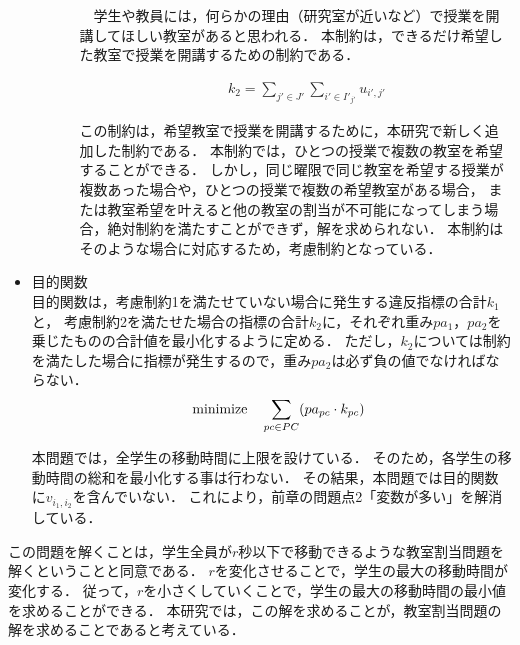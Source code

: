 \documentclass[12pt, a4paper, fleqn]{jreport}
\begin{document}
\begin{itemize}
\begin{itemize}
\begin{itemize}
\vspace{-5.0mm}
　学生や教員には，何らかの理由（研究室が近いなど）で授業を開講してほしい教室があると思われる．
本制約は，できるだけ希望した教室で授業を開講するための制約である．

\vspace{-3.0mm}
\begin{eqnarray}
\label{hkouryo2} 
&&k_2= \sum_{j' \in J'}  \sum_{i' \in I'_{j'}}u_{i', j'}
\end{eqnarray}

\vspace{5.0mm}
この制約は，希望教室で授業を開講するために，本研究で新しく追加した制約である．
本制約では，ひとつの授業で複数の教室を希望することができる．
しかし，同じ曜限で同じ教室を希望する授業が複数あった場合や，ひとつの授業で複数の希望教室がある場合，
または教室希望を叶えると他の教室の割当が不可能になってしまう場合，絶対制約を満たすことができず，解を求められない．
本制約はそのような場合に対応するため，考慮制約となっている．

\vspace{5.0mm}
\end{itemize}
\end{itemize}
\item 目的関数\\
目的関数は，考慮制約1を満たせていない場合に発生する違反指標の合計$k_1$と，
考慮制約2を満たせた場合の指標の合計$k_2$に，それぞれ重み$pa_1$，$pa_2$を乗じたものの合計値を最小化するように定める．
ただし，$k_2$については制約を満たした場合に指標が発生するので，重み$pa_2$は必ず負の値でなければならない．
\begin{eqnarray}
\label{hmokuteki} 
&&{\rm minimize} \quad \sum_{pc \in PC} (pa_{pc} \cdot k_{pc}) \label{eqn:mokuteki}
\end{eqnarray}

本問題では，全学生の移動時間に上限を設けている．
そのため，各学生の移動時間の総和を最小化する事は行わない．
その結果，本問題では目的関数に$v_{i_1,i_2}$を含んでいない．
これにより，前章の問題点2「変数が多い」を解消している．
\end{itemize}

この問題を解くことは，学生全員が$r$秒以下で移動できるような教室割当問題を解くということと同意である．
$r$を変化させることで，学生の最大の移動時間が変化する．
従って，$r$を小さくしていくことで，学生の最大の移動時間の最小値を求めることができる．
本研究では，この解を求めることが，教室割当問題の解を求めることであると考えている．
\end{document}
